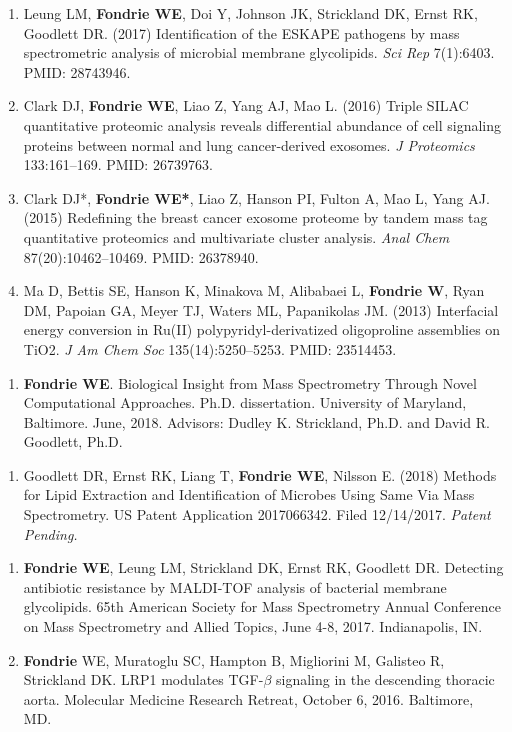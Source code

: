 \documentclass{article}
\newcommand{\mysection}[1]{\vspace{1ex}{\bf #1}}
\begin{document}
\begin{enumerate}
  \item Leung LM, {\bf Fondrie WE}, Doi Y, Johnson JK, Strickland DK, Ernst RK,
    Goodlett DR. (2017) Identification of the ESKAPE pathogens by mass
    spectrometric analysis of microbial membrane glycolipids. {\it Sci Rep}
    7(1):6403. PMID: 28743946. 

  \item Clark DJ, {\bf Fondrie WE}, Liao Z, Yang AJ, Mao L. (2016) Triple SILAC
    quantitative proteomic analysis reveals differential abundance of cell
    signaling proteins between normal and lung cancer-derived exosomes. {\it J
      Proteomics} 133:161--169. PMID: 26739763.

  \item Clark DJ*, {\bf Fondrie WE*}, Liao Z, Hanson PI, Fulton A, Mao L, Yang
    AJ. (2015) Redefining the breast cancer exosome proteome by tandem mass tag
    quantitative proteomics and multivariate cluster analysis. \textit{Anal
      Chem} 87(20):10462--10469. PMID: 26378940. 
    
  \item Ma D, Bettis SE, Hanson K, Minakova M, Alibabaei L, {\bf Fondrie W},
    Ryan DM, Papoian GA, Meyer TJ, Waters ML, Papanikolas JM. (2013) Interfacial
    energy conversion in Ru(II) polypyridyl-derivatized oligoproline assemblies
    on TiO2. \textit{J Am Chem Soc} 135(14):5250--5253. PMID: 23514453. 
\end{enumerate}

\mysection{Additional Publications}
\begin{enumerate}
  \item {\bf Fondrie WE}. Biological Insight from Mass Spectrometry Through
    Novel Computational Approaches. Ph.D. dissertation. University of Maryland,
    Baltimore. June, 2018. Advisors: Dudley K. Strickland, Ph.D. and David R.
    Goodlett, Ph.D.
\end{enumerate}

\mysection{Patents}
\begin{enumerate}
  \item Goodlett DR, Ernst RK, Liang T, {\bf Fondrie WE}, Nilsson E. (2018)
    Methods for Lipid Extraction and Identification of Microbes Using Same Via
    Mass Spectrometry. US Patent Application 2017066342. Filed 12/14/2017. {\it
      Patent Pending.}
\end{enumerate}

\mysection{Oral Presentations}
\begin{enumerate}
  \item {\bf Fondrie WE}, Leung LM, Strickland DK, Ernst RK, Goodlett DR.
    Detecting antibiotic resistance by MALDI-TOF analysis of bacterial membrane
    glycolipids. 65th American Society for Mass Spectrometry Annual Conference
    on Mass Spectrometry and Allied Topics, June 4-8, 2017. Indianapolis, IN.
    
  \item {\bf Fondrie} WE, Muratoglu SC, Hampton B, Migliorini M, Galisteo R,
    Strickland DK. LRP1 modulates TGF-$\beta$ signaling in the descending
    thoracic aorta. Molecular Medicine Research Retreat, October 6, 2016.
    Baltimore, MD.
\end{enumerate}
\end{document}
